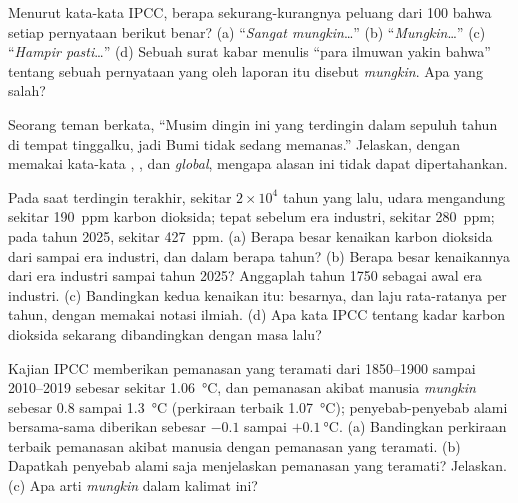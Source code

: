 \begin{exercise}[$\star\star$]\label{exo:g9:climate-past-and-present:9}
Menurut kata-kata IPCC, berapa sekurang-kurangnya peluang dari 100 bahwa
setiap pernyataan berikut benar? (a) ``\emph{Sangat mungkin}\ldots''
(b) ``\emph{Mungkin}\ldots'' (c) ``\emph{Hampir pasti}\ldots'' (d) Sebuah
surat kabar menulis ``para ilmuwan yakin bahwa'' tentang sebuah pernyataan
yang oleh laporan itu disebut \emph{mungkin}. Apa yang salah?
\end{exercise}

\begin{exercise}[$\star\star$]\label{exo:g9:climate-past-and-present:10}
Seorang teman berkata, ``Musim dingin ini yang terdingin dalam sepuluh
tahun di tempat tinggalku, jadi Bumi tidak sedang memanas.'' Jelaskan,
dengan memakai kata-kata \emph{}, \emph{}, dan \emph{global},
mengapa alasan ini tidak dapat dipertahankan.
\end{exercise}

\begin{exercise}[$\star\star\star$]\label{exo:g9:climate-past-and-present:11}
Pada saat terdingin  terakhir, sekitar $2 \times 10^4$ tahun yang
lalu, udara mengandung sekitar \qty{190}{ppm} karbon dioksida; tepat
sebelum era industri, sekitar \qty{280}{ppm}; pada tahun 2025, sekitar
\qty{427}{ppm}. (a) Berapa besar kenaikan karbon dioksida dari 
sampai era industri, dan dalam berapa tahun? (b) Berapa besar kenaikannya
dari era industri sampai tahun 2025? Anggaplah tahun 1750 sebagai awal era
industri. (c) Bandingkan kedua kenaikan itu: besarnya, dan laju
rata-ratanya per tahun, dengan memakai notasi ilmiah. (d) Apa kata IPCC
tentang kadar karbon dioksida sekarang dibandingkan dengan masa lalu?
\end{exercise}

\begin{exercise}[$\star\star\star$]\label{exo:g9:climate-past-and-present:12}
Kajian IPCC memberikan pemanasan yang teramati dari 1850--1900 sampai
2010--2019 sebesar sekitar \qty{1.06}{\degreeCelsius}, dan pemanasan
akibat manusia \emph{mungkin} sebesar 0.8 sampai \qty{1.3}{\degreeCelsius}
(perkiraan terbaik \qty{1.07}{\degreeCelsius}); penyebab-penyebab alami
bersama-sama diberikan sebesar
$-0.1$ sampai $+\qty{0.1}{\degreeCelsius}$. (a) Bandingkan perkiraan
terbaik pemanasan akibat manusia dengan pemanasan yang teramati.
(b) Dapatkah penyebab alami saja menjelaskan pemanasan yang teramati?
Jelaskan. (c) Apa arti \emph{mungkin} dalam kalimat ini?
\end{exercise}

